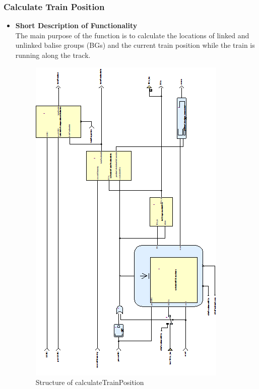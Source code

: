 \subsubsection{Calculate Train Position}\label{sss:calctrainpos}

\begin{itemize}
\item \textbf{Short Description of Functionality}\\
The main purpose of the function is to calculate the locations of linked and unlinked balise groups (BGs) and the current train position while the train is running along the track. 

\begin{figure}[hbtp]
\centering
\includegraphics[scale=1]{../images/CalculateTrainPosition.png}
\caption{Structure of calculateTrainPosition}
\end{figure}




\end{itemize}
